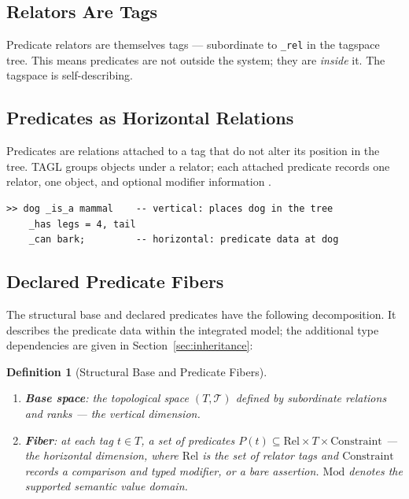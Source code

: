 \documentclass{article}
\newtheorem{definition}{Definition}[section]
\begin{document}
\subsection{Relators Are Tags}

Predicate relators are themselves tags --- subordinate to \texttt{\_rel} in
the tagspace tree. This means predicates are not outside the system; they are
\emph{inside} it. The tagspace is self-describing.

\subsection{Predicates as Horizontal Relations}

Predicates are relations attached to a tag that do not alter its position in
the tree. TAGL groups objects under a relator; each attached predicate
records one relator, one object, and optional modifier information
\cite{spec,tagdh}.

\begin{lstlisting}[style=tagl, caption={Vertical identity and horizontal predicates}]
>> dog _is_a mammal    -- vertical: places dog in the tree
    _has legs = 4, tail
    _can bark;         -- horizontal: predicate data at dog
\end{lstlisting}

\subsection{Declared Predicate Fibers}

The structural base and declared predicates have the following decomposition.
It describes the predicate data within the integrated model; the additional
type dependencies are given in Section~\ref{sec:inheritance}:

\begin{definition}[Structural Base and Predicate Fibers]
\begin{enumerate}
  \item \textbf{Base space}: the topological space $(T, \mathcal{T})$ defined
        by subordinate relations and ranks --- the vertical dimension.
  \item \textbf{Fiber}: at each tag $t \in T$, a set of predicates
        $P(t) \subseteq \mathrm{Rel} \times T \times \mathrm{Constraint}$ --- the
        horizontal dimension, where $\mathrm{Rel}$ is the set of relator tags
        and $\mathrm{Constraint}$ records a comparison and typed modifier, or a bare
        assertion. $\mathrm{Mod}$ denotes the supported semantic value domain.
\end{enumerate}
\end{definition}
\end{document}
